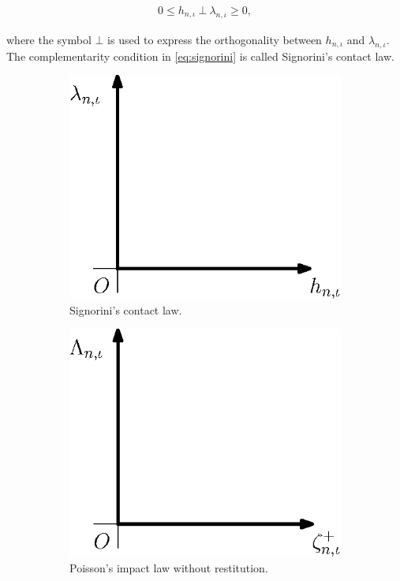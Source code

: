 \documentclass[../DC2017114Bouma.tex]{subfiles}
\begin{document}
\begin{align}
0\leq h_{n,\iota}\ \bot\ \lambda_{n,\iota} \geq 0,\label{eq:signorini}
\end{align}

where the symbol $\bot$ is used to express the orthogonality between $h_{n,\iota}$ and $\lambda_{n,\iota}$. The complementarity condition in \eqref{eq:signorini} is called Signorini's contact law.
\begin{figure}[h]
\centering
\begin{subfigure}{0.3\textwidth}
\centering
\includegraphics[width=\linewidth]{signorinicontact.eps}
\caption{Signorini's contact law.}\label{fig:signorinicontact}
\end{subfigure}
\qquad
\begin{subfigure}{0.3\textwidth}
\centering
\includegraphics[width=\linewidth]{poissonimpact.eps}
\caption{Poisson's impact law without restitution.}\label{fig:poissonimpact}
\end{subfigure}
\caption{}
\end{figure}
\end{document}

